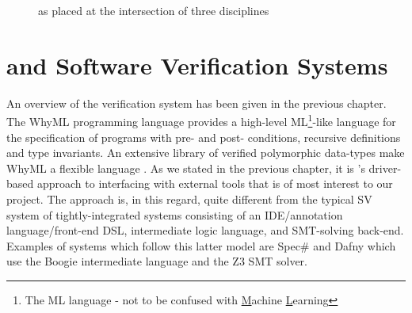 \begin{figure}

\centering
\def\firstcircle{(3cm,0cm) circle (2.5cm)}
\def\secondcircle{(0cm,0cm) circle (2.5cm)}
\def\thirdcircle{(1.5cm,3cm) circle (2.5cm)}

\caption{\where as placed at the intersection of three disciplines}
\label{fig:litreview}

\end{figure}


\section{\why and Software Verification Systems}
\label{sec:lrsv}

An overview of the \why verification system \cite{why:shephard,why:whereprovers} has been given in the previous chapter. The WhyML programming language provides a high-level ML\footnote{The ML language - not to be confused with \underline{M}achine \underline{L}earning}-like language for the specification of programs with pre- and post- conditions, recursive definitions and type invariants. An extensive library of verified polymorphic data-types make WhyML a flexible language \cite{verifythis,why:polymorphic}. As we stated in the previous chapter, it is \why's driver-based approach to interfacing with external tools that is of most interest to our project. The \why approach is, in this regard, quite different from the typical SV system of tightly-integrated systems consisting of an IDE/annotation language/front-end DSL, intermediate logic language, and SMT-solving back-end. Examples of systems which follow this latter model are Spec\# \cite{spec} and Dafny \cite{Dafny} which use the Boogie \cite{Boogie} intermediate language and the Z3 \cite{Z3} SMT solver.

